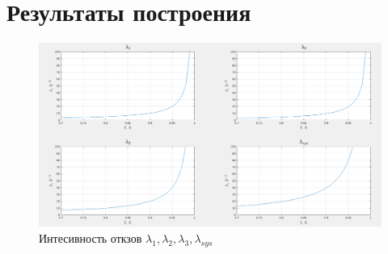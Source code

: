 \section{Результаты построения}
\begin{figure}[h]
  \centering
  \includegraphics[width=\linewidth]{assets/plots}
  \caption{Интесивность откзов $\lambda_{1}, \lambda_{2}, \lambda_{3}, \lambda_{sys}$}
  \label{img:21-0}
\end{figure}